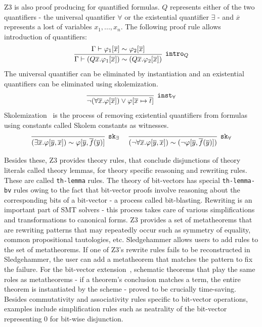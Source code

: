 \documentclass{article}
\begin{document}
		Z3 is also proof producing for quantified formulas.
		$Q$ represents either of the two quantifiers - 
		the universal quantifier $\forall$ or the 
		existential quantifier $\exists$ - and 
		$\overline{x}$ represents a lost of variables 
		$x_1,...,x_n$. The following 
		proof rule allows introduction of quantifiers:
		\begin{equation*}
			\infer[\texttt{intro$_Q$}]
			{\Gamma \vdash (Q \overline{x}.\varphi_1 [ \overline{x}]) \sim (Q \overline{x}.\varphi_2 [ \overline{x}])}
			{\Gamma \vdash \varphi_1 [\overline{x}] \sim \varphi_2 [\overline{x}]}
		\end{equation*}
		The universal quantifier can be eliminated by 
		instantiation and an existential quantifiers 
		can be eliminated using skolemization.
		\begin{equation*}
		\infer[\texttt{inst$_\forall$}]
			{\neg(\forall\overline{x}.\varphi[\overline{x}])
			\lor \varphi[\overline{x} \mapsto \overline{t}]}
			{}
		\end{equation*}
		Skolemization~\cite{NONNENGART2001335} is the process 
		of removing existential quantifiers from formulas using 
		constants called Skolem constants as witnesses.
		\begin{equation*}
		\infer[\texttt{sk$_\exists$}]
			{(\exists\overline{x}.\varphi[\overline{y},\overline{x}]) 
			\sim \varphi[\overline{y},\overline{f}(\overline{y})]}
			{}\ \ \ \ 
		\infer[\texttt{sk$_\forall$}]
		{(\neg\forall\overline{x}.\varphi[\overline{y},\overline{x}]) 
			\sim (\neg \varphi[\overline{y},\overline{f}(\overline{y})])}
		{}	
		\end{equation*}
		
		Besides these, Z3 provides theory rules, 
		that conclude disjunctions of theory literals 
		called theory lemmas, for theory specific reasoning
		and rewriting rules. These are called 
		\texttt{th-lemma} rules. The theory of bit-vectors
		has special \texttt{th-lemma-bv} rules owing to 
		the fact that bit-vector proofs involve reasoning 
		about the corresponding bits of a bit-vector - 
		a process called bit-blasting. Rewriting is an 
		important part of SMT solvers - this process takes 
		care of various simplifications and 
		transformations to canonical forms. Z3 
		provides a set of metatheorems that are 
		rewriting patterns that may repeatedly 
		occur such as symmetry of equality, common 
		propositional tautologies, etc. Sledgehammer
		allows users to add rules to the set of 
		metatheorems. If one of Z3's rewrite rules 
		fails to be reconstructed in Sledgehammer, 
		the user can add a metatheorem that 
		matches the pattern to fix the failure.
		For the bit-vector 
		extension~\cite{10.1007/978-3-642-25379-9_15}, 
		schematic theorems that play the same roles 
		as metatheorems - if a theorem's conclusion 
		matches a term, the entire theorem is 
		instantiated by the scheme - proved to 
		be crucially time-saving. Besides commutativity 
		and associativity rules specific to bit-vector
		operations, examples include simplification 
		rules such as neatrality of the bit-vector 
		representing $0$ for bit-wise disjunction.
		
\end{document}
